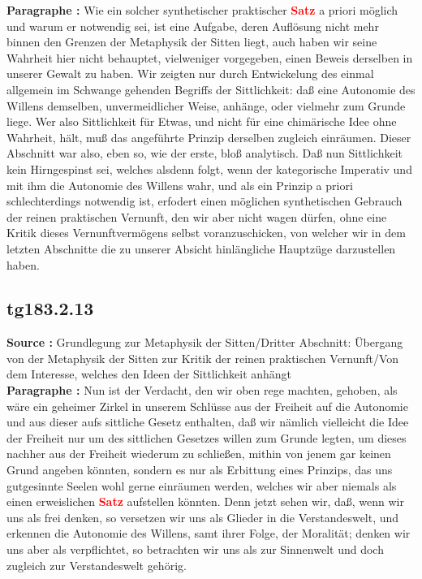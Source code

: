 \documentclass[a4paper,12pt,twoside]{book}
\newcommand{\match}[1]{\textcolor{red}{\textbf{#1}}}
\begin{document}
	\noindent\textbf{Paragraphe : }
	Wie ein solcher synthetischer praktischer \match{Satz} a priori möglich und warum er notwendig sei, ist eine Aufgabe, deren Auflösung nicht mehr binnen den Grenzen der Metaphysik der Sitten liegt, auch haben wir seine Wahrheit hier nicht behauptet, vielweniger vorgegeben, einen Beweis derselben in unserer Gewalt zu haben. Wir zeigten nur durch Entwickelung des einmal allgemein im Schwange gehenden Begriffs der Sittlichkeit: daß eine Autonomie des Willens demselben, unvermeidlicher Weise, anhänge, oder vielmehr zum Grunde liege. Wer also Sittlichkeit für Etwas, und nicht für eine chimärische Idee ohne Wahrheit, hält, muß das angeführte Prinzip derselben zugleich einräumen. Dieser Abschnitt war also, eben so, wie der erste, bloß analytisch. Daß nun Sittlichkeit kein Hirngespinst sei, welches alsdenn folgt, wenn der kategorische Imperativ und mit ihm die Autonomie des Willens wahr, und als ein Prinzip a priori schlechterdings notwendig ist, erfodert einen möglichen synthetischen Gebrauch der reinen praktischen Vernunft, den wir aber nicht wagen dürfen, ohne eine Kritik dieses Vernunftvermögens selbst voranzuschicken, von welcher wir in dem letzten Abschnitte die zu unserer Absicht hinlängliche Hauptzüge darzustellen haben. 
	
	\subsection*{tg183.2.13} 
	\textbf{Source : }Grundlegung zur Metaphysik der Sitten/Dritter Abschnitt: Übergang von der Metaphysik der Sitten zur Kritik der reinen praktischen Vernunft/Von dem Interesse, welches den Ideen der Sittlichkeit anhängt\\  
	
	\noindent\textbf{Paragraphe : }Nun ist der Verdacht, den wir oben rege machten, gehoben, als wäre ein geheimer Zirkel in unserem Schlüsse aus der Freiheit auf die Autonomie und aus dieser aufs sittliche Gesetz enthalten, daß wir nämlich vielleicht die Idee der Freiheit nur um des sittlichen Gesetzes willen zum Grunde legten, um dieses nachher aus der Freiheit wiederum zu schließen, mithin von jenem gar keinen Grund angeben könnten, sondern es nur als Erbittung eines Prinzips, das uns gutgesinnte Seelen wohl gerne einräumen werden, welches wir aber niemals als einen erweislichen \match{Satz} aufstellen könnten. Denn jetzt sehen wir, daß, wenn wir uns als frei denken, so versetzen wir uns als Glieder in die Verstandeswelt, und erkennen die Autonomie des Willens, samt ihrer Folge, der Moralität; denken wir uns aber als verpflichtet, so betrachten wir uns als zur Sinnenwelt und doch zugleich zur Verstandeswelt gehörig. 
	
\end{document}
